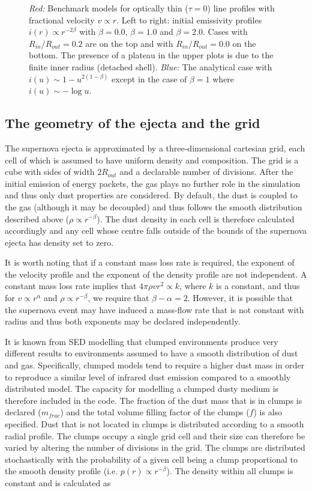 \documentclass[useAMS,usenatbib,usegraphicx]{mnras}
\begin{document}
\begin{figure}
\caption{\textit{Red:} Benchmark models for optically thin ($\tau =0$) 
line profiles  with fractional velocity $v \propto r$. Left to right: initial emissivity 
profiles $i(r) \propto r^{-2\beta}$ with $\beta=0.0$, $\beta=1.0$ and 
$\beta=2.0$. Cases with $R_{in}/R_{out}=0.2$ are on the top and 
with $R_{in}/R_{out}=0.0$ on the bottom.  The presence of a plateau in the upper plots is due to the finite inner radius (detached shell). \textit{Blue:} The analytical case 
with $i(u) \sim 1-u^{2(1-\beta)}$ except in the case of $\beta=1$ where 
$i(u) \sim -\log u$.}
\label{fig:analytics}
\end{figure}

\subsection{The geometry of the ejecta and the grid}
\label{grid}

The supernova ejecta is approximated by a three-dimensional cartesian 
grid, each cell of which is assumed to have uniform density and 
composition.  The grid is a cube with sides of width $2R_{out}$ and a 
declarable number of divisions.  After the initial emission of energy 
packets, the gas plays no further role in the simulation and thus only 
dust properties are considered.  By default, the dust is coupled to the 
gas (although it may be decoupled) and thus follows the smooth 
distribution described above ($\rho \propto r^{-\beta}$).  The dust 
density in each cell is therefore calculated accordingly and any cell 
whose centre falls outside of the bounds of the supernova ejecta has 
density set to zero.

It is worth noting that if a constant mass loss rate is required, the 
exponent of the velocity profile and the exponent of the density profile 
are not independent.  A constant mass loss rate implies that $4\pi \rho 
vr^2 \propto k$, where $k$ is a constant, and thus for $v \propto 
r^\alpha$ and $\rho\propto r^{-\beta}$, we require that $\beta-\alpha=2$.  
However, it is possible that the supernova event may have induced a 
mass-flow rate that is not constant with radius and thus both exponents 
may be declared independently.

It is known from SED modelling that clumped environments produce very 
different results to environments assumed to have a smooth distribution of 
dust and gas.  Specifically, clumped models tend to require a higher dust mass in 
order to reproduce a similar level of infrared dust emission compared to a smoothly distributed model.  The 
capacity for modelling a clumped dusty medium is therefore included in the 
code.  The fraction of the dust mass that is in clumps is declared 
($m_{frac}$) and the total volume filling factor of the clumps ($f$) is 
also specified.  Dust that is not located in clumps is distributed 
according to a smooth radial profile.  The clumps occupy a single grid 
cell and their size can therefore be varied by altering the number of 
divisions in the grid.  The clumps are distributed stochastically with the 
probability of a given cell being a clump proportional to the smooth 
density profile (i.e. $p(r) \propto r^{-\beta}$).  The density within all 
clumps is constant and is calculated as
\end{document}
